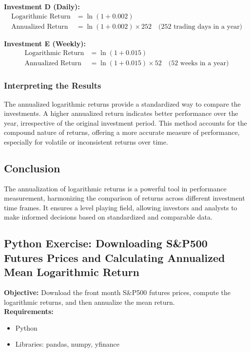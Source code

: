 \documentclass{article}
\begin{document}
\textbf{Investment D (Daily):}
\begin{align*}
    \text{Logarithmic Return} &= \ln(1 + 0.002) \\
    \text{Annualized Return} &= \ln(1 + 0.002) \times 252 \quad \text{(252 trading days in a year)}
\end{align*}

\textbf{Investment E (Weekly):}
\begin{align*}
    \text{Logarithmic Return} &= \ln(1 + 0.015) \\
    \text{Annualized Return} &= \ln(1 + 0.015) \times 52 \quad \text{(52 weeks in a year)}
\end{align*}

\subsubsection*{Interpreting the Results}

The annualized logarithmic returns provide a standardized way to compare the investments. A higher annualized return indicates better performance over the year, irrespective of the original investment period. This method accounts for the compound nature of returns, offering a more accurate measure of performance, especially for volatile or inconsistent returns over time.

\subsection{Conclusion}

The annualization of logarithmic returns is a powerful tool in performance measurement, harmonizing the comparison of returns across different investment time frames. It ensures a level playing field, allowing investors and analysts to make informed decisions based on standardized and comparable data.

\subsection*{Python Exercise: Downloading S\&P500 Futures Prices and Calculating Annualized Mean Logarithmic Return}

\textbf{Objective:} Download the front month S\&P500 futures prices, compute the logarithmic returns, and then annualize the mean return. \\

\textbf{Requirements:}
\begin{itemize}
    \item Python
    \item Libraries: pandas, numpy, yfinance
\end{itemize}
\end{document}
